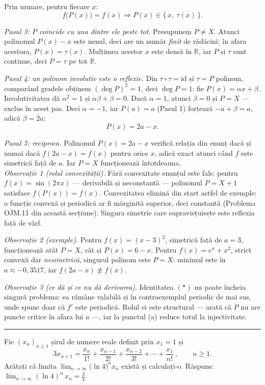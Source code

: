 Prin urmare, pentru fiecare $x$:
\[ f\bigl(P(x)\bigr)=f(x) \Longrightarrow P(x)\in\{\,x,\ \tau(x)\,\} . \]

\emph{Pasul 3: $P$ coincide cu una dintre ele peste tot.} Presupunem $P\neq X$. Atunci polinomul $P(x)-x$ este nenul, deci are un număr \emph{finit} de rădăcini; în afara acestora, $P(x)=\tau(x)$. Mulțimea acestor $x$ este densă în $\mathbb{R}$, iar $P$ și $\tau$ sunt continue, deci $P=\tau$ pe tot $\mathbb{R}$.

\emph{Pasul 4: un polinom involutiv este o reflexie.} Din $\tau\circ\tau=\mathrm{id}$ și $\tau=P$ polinom, comparând gradele obținem $(\deg P)^2=1$, deci $\deg P=1$: fie $P(x)=\alpha x+\beta$. Involutivitatea dă $\alpha^2=1$ și $\alpha\beta+\beta=0$. Dacă $\alpha=1$, atunci $\beta=0$ și $P=X$ --- exclus în acest pas. Deci $\alpha=-1$, iar $P(a)=a$ (Pasul 1) forțează $-a+\beta=a$, adică $\beta=2a$:
\[ P(x)=2a-x . \]

\emph{Pasul 5: reciproca.} Polinomul $P(x)=2a-x$ verifică relația din enunț dacă și numai dacă $f(2a-x)=f(x)$ pentru orice $x$, adică exact atunci când $f$ este simetrică față de $a$. Iar $P=X$ funcționează întotdeauna.\\[2pt]
\emph{Observație 1 (rolul convexității).} Fără convexitate enunțul este fals: pentru $f(x)=\sin(2\pi x)$ --- derivabilă și neconstantă --- polinomul $P=X+1$ satisface $f(P(x))=f(x)$. Convexitatea elimină din start astfel de exemple: o funcție convexă și periodică ar fi mărginită superior, deci constantă (Problema OJM.11 din această secțiune). Singura simetrie care supraviețuiește este reflexia față de vârf.

\emph{Observație 2 (exemple).} Pentru $f(x)=(x-3)^2$, simetrică față de $a=3$, funcționează atât $P=X$, cât și $P(x)=6-x$. Pentru $f(x)=e^x+x^2$, strict convexă dar \emph{nesimetrică}, singurul polinom este $P=X$: minimul este în $a\approx-0{,}3517$, iar $f(2a-x)\not\equiv f(x)$.

\emph{Observație 3 (ce dă și ce nu dă derivarea).} Identitatea $(\ast)$ nu poate încheia singură problema: ea rămâne valabilă și în contraexemplul periodic de mai sus, unde spune doar că $f'$ este periodică. Rolul ei este structural --- arată că $P$ nu are puncte critice în afara lui $a$ ---, iar la punctul (a) reduce totul la injectivitate.
\vspace{1mm}\hrule

Fie $(x_n)_{n\ge1}$ șirul de numere reale definit prin $x_1=1$ și
\[ 3x_{n+1}=\frac{x_n}{1!}+\frac{x_{n-1}}{2!}+\frac{x_{n-2}}{3!}+\cdots+\frac{x_1}{n!}\ ,\qquad n\ge1 . \]
Arătați că limita $\displaystyle\lim_{n\to\infty}\bigl(\ln4\bigr)^{n}x_n$ există și calculați-o.
\sol Răspuns: $\displaystyle\lim_{n\to\infty}(\ln4)^n\,x_n=\frac34$.

